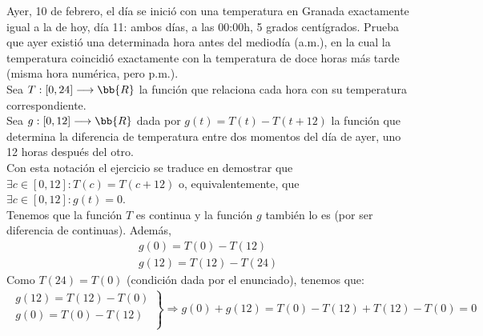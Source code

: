 \documentclass[12pt]{article}
\begin{document}
    \begin{ejercicio}[2 puntos]
        Ayer, 10 de febrero, el día se inició con una temperatura en Granada exactamente igual a la de hoy, día 11: ambos días, a las 00:00h, 5 grados centígrados. Prueba que ayer existió una determinada hora antes del mediodía (a.m.), en la cual la temperatura coincidió exactamente con la temperatura de doce horas más tarde (misma hora numérica, pero p.m.).\\

        Sea $T:[0,24]\longrightarrow \bb{R}$ la función que relaciona cada hora con su temperatura correspondiente.\\
        
        Sea $g:[0,12]\longrightarrow \bb{R}$ dada por $g(t) = T(t)-T(t+12)$ la función que determina la diferencia de temperatura entre dos momentos del día de ayer, uno 12 horas después del otro.\\

        Con esta notación el ejercicio se traduce en demostrar que $\exists c \in [0,12] : T(c)=T(c+12)$ o, equivalentemente, que $\exists c \in [0,12] : g(t)=0$.\\

        Tenemos que la función $T$ es continua y la función $g$ también lo es (por ser diferencia de continuas). Además,
        \begin{gather*}
            g(0) = T(0)-T(12)\\
            g(12)=T(12)-T(24)
        \end{gather*}
        Como $T(24)=T(0)$ (condición dada por el enunciado), tenemos que:
        \begin{gather*}
            \left.
            \begin{array}{l}
                g(12)=T(12)-T(0)\\
                g(0)=T(0)-T(12)\\
            \end{array}
            \right\} \Rightarrow g(0) + g(12) = T(0) - T(12) +T(12) -T(0) = 0\\
        \end{gather*}


\end{ejercicio}
\end{document}
